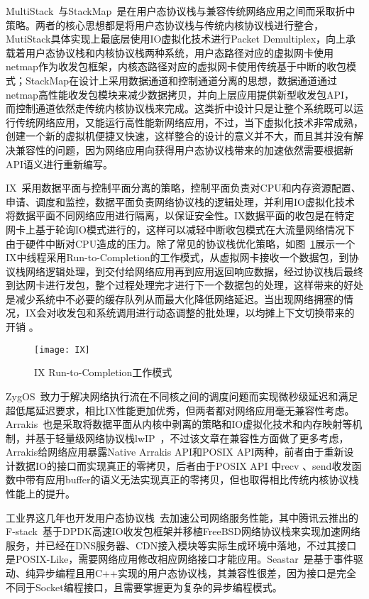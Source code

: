 MultiStack~\cite{Honda2014Rekindling}与StackMap~\cite{StackMap}是在用户态协议栈与兼容传统网络应用之间而采取折中策略。两者的核心思想都是将用户态协议栈与传统内核协议栈进行整合，MutiStack具体实现上最底层使用IO虚拟化技术进行Packet Demultiplex，向上承载着用户态协议栈和内核协议栈两种系统，用户态路径对应的虚拟网卡使用netmap作为收发包框架，内核态路径对应的虚拟网卡使用传统基于中断的收包模式；StackMap在设计上采用数据通道和控制通道分离的思想，数据通道通过netmap高性能收发包模块来减少数据拷贝，并向上层应用提供新型收发包API，而控制通道依然走传统内核协议栈来完成。这类折中设计只是让整个系统既可以运行传统网络应用，又能运行高性能新网络应用，不过，当下虚拟化技术非常成熟，创建一个新的虚拟机便捷又快速，这样整合的设计的意义并不大，而且其并没有解决兼容性的问题，因为网络应用向获得用户态协议栈带来的加速依然需要根据新API语义进行重新编写。

IX~\cite{IX}采用数据平面与控制平面分离的策略，控制平面负责对CPU和内存资源配置、申请、调度和监控，数据平面负责网络协议栈的逻辑处理，并利用IO虚拟化技术将数据平面不同网络应用进行隔离，以保证安全性。IX数据平面的收包是在特定网卡上基于轮询IO模式进行的，这样可以减轻中断收包模式在大流量网络情况下由于硬件中断对CPU造成的压力。除了常见的协议栈优化策略，如图~\ref{fig:IX}展示一个IX中线程采用Run-to-Completion的工作模式，从虚拟网卡接收一个数据包，到协议栈网络逻辑处理，到交付给网络应用再到应用返回响应数据，经过协议栈后最终到达网卡进行发包，整个过程处理完才进行下一个数据包的处理，这样带来的好处是减少系统中不必要的缓存队列从而最大化降低网络延迟。当出现网络拥塞的情况，IX会对收发包和系统调用进行动态调整的批处理，以均摊上下文切换带来的开销
。

\vspace{-10pt}
\begin{figure}[H] %
  \centering
  \texttt{[image: IX]}
  \caption{IX Run-to-Completion工作模式}
  \label{fig:IX}
\end{figure}
\vspace{-10pt}

ZygOS~\cite{ZygOS}致力于解决网络执行流在不同核之间的调度问题而实现微秒级延迟和满足超低尾延迟要求，相比IX性能更加优秀，但两者都对网络应用毫无兼容性考虑。Arrakis~\cite{Peter2015Arrakis}也是采取将数据平面从内核中剥离的策略和IO虚拟化技术和内存映射等机制，并基于轻量级网络协议栈lwIP~\cite{lwIP}，不过该文章在兼容性方面做了更多考虑，Arrakis给网络应用暴露Native Arrakis API和POSIX API两种，前者由于重新设计数据IO的接口而实现真正的零拷贝，后者由于POSIX API 中recv 、send收发函数中带有应用buffer的语义无法实现真正的零拷贝，但也取得相比传统内核协议栈性能上的提升。

工业界这几年也开发用户态协议栈~\cite{libuinet,pope2011introduction,Seastar,fstack}去加速公司网络服务性能，其中腾讯云推出的F-stack~\cite{fstack}基于DPDK高速IO收发包框架并移植FreeBSD网络协议栈来实现加速网络服务，并已经在DNS服务器、CDN接入模块等实际生成环境中落地，不过其接口是POSIX-Like，需要网络应用修改相应网络接口才能应用。Seastar~\cite{Seastar}是基于事件驱动、纯异步编程且用C++实现的用户态协议栈，其兼容性很差，因为接口是完全不同于Socket编程接口，且需要掌握更为复杂的异步编程模式。